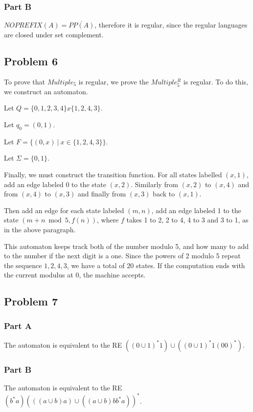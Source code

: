 \documentclass[12pt]
{article}
\begin{document}
\subsubsection*{Part B}
$NOPREFIX(A) = \overline{PP(A)}$, therefore it is regular, since the regular
languages are closed under set complement.

\subsection*{Problem 6}

To prove that $Multiple_5$ is regular, we prove the $Multiple_5^R$ is
regular.  To do this, we construct an automaton.  

Let $Q = \{0,1,2,3,4\} x \{1,2,4,3\}$.

Let $q_0 = (0,1)$.

Let $F = \{(0,x)~|~ x \in \{1,2,4,3\}\}$.

Let $\Sigma = \{0,1\}.$

Finally, we must construct the transition function.  For all states
labelled $(x,1)$, add an edge labeled 0 to the state $(x,2)$.
Similarly from $(x,2)$ to $(x,4)$ and from $(x,4)$ to $(x,3)$ and
finally from $(x,3)$ back to $(x,1)$.  

Then add an edge for each state labeled $(m,n)$, add an edge labeled 1
to the state $(m+n\bmod 5, f(n))$, where $f$ takes 1 to 2, 2 to 4, 4
to 3 and 3 to 1, as in the above paragraph.  

This automaton keeps track both of the number modulo 5, and how many
to add to the number if the next digit is a one.  Since the powers of
2 modulo 5 repeat the sequence $1,2,4,3$, we have a total of 20
states.  If the computation ends with the current modulus at 0, the
machine accepts.  

\subsection*{Problem 7}

\subsubsection*{Part A}
The automaton is equivalent to the RE $((0 \cup 1)^*1) \cup ((0 \cup
1)^*1(00)^*)$.

\subsubsection*{Part B}
The automaton is equivalent to the RE $(b^*a) (((a \cup b)a) \cup ((a
\cup b)bb^*a))^*$.
\end{document}
